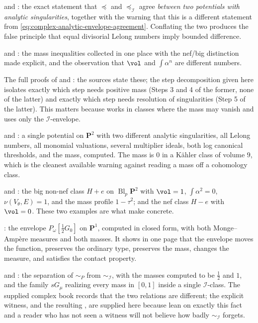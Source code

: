  and : the exact
statement that \(\preceq\) and \(\preceq_{\mathcal I}\) agree
\emph{between two potentials with analytic singularities}, together with
the warning that this is a different statement from
\eqref{eq:complex-analytic-envelope-agreement}.  Conflating the two
produces the false principle that equal divisorial Lelong numbers imply
bounded difference.

 and
: the mass inequalities collected
in one place with the nef/big distinction made explicit, and the
observation that \(\vol\) and \(\int\alpha^n\) are different numbers.

The full proofs of  and
: the sources state these; the step
decomposition given here isolates exactly which step needs positive mass
(Steps 3 and 4 of the former, none of the latter) and exactly which step
needs resolution of singularities (Step 5 of the latter).  This matters
because  works in classes where the
mass may vanish and uses only the \(\mathcal I\)-envelope.

 and : a single potential
on \(\mathbf P^2\) with two different analytic singularities, all Lelong
numbers, all monomial valuations, several multiplier ideals, both log
canonical thresholds, and the mass, computed.  The mass is \(0\) in a
K\"ahler class of volume \(9\), which is the cleanest available warning
against reading a mass off a cohomology class.

 and : the
big non-nef class \(H+e\) on \(\operatorname{Bl}_p\mathbf P^2\) with
\(\vol=1\), \(\int\alpha^2=0\), \(\nu(V_\theta,E)=1\), and the mass
profile \(1-\tau^2\); and the nef class \(H-e\) with \(\vol=0\).  These
two examples are what make  concrete.

: the envelope \(P_\omega[\frac12G_0]\) on
\(\mathbf P^1\), computed in closed form, with both Monge--Amp\`ere
measures and both masses.  It shows in one page that the envelope moves
the function, preserves the ordinary type, preserves the mass, changes
the measure, and satisfies the contact property.

 and : the separation of
\(\sim_P\) from \(\sim_{\mathcal I}\), with the masses computed to be
\(\frac12\) and \(1\), and the family \(sG_\mu\) realizing every mass in
\([0,1]\) inside a single \(\mathcal I\)-class.  The supplied complex
book records that the two relations are different; the explicit witness,
and the resulting , are supplied here
because  lean on
exactly this fact and a reader who has not seen a witness will not
believe how badly \(\sim_{\mathcal I}\) forgets.

